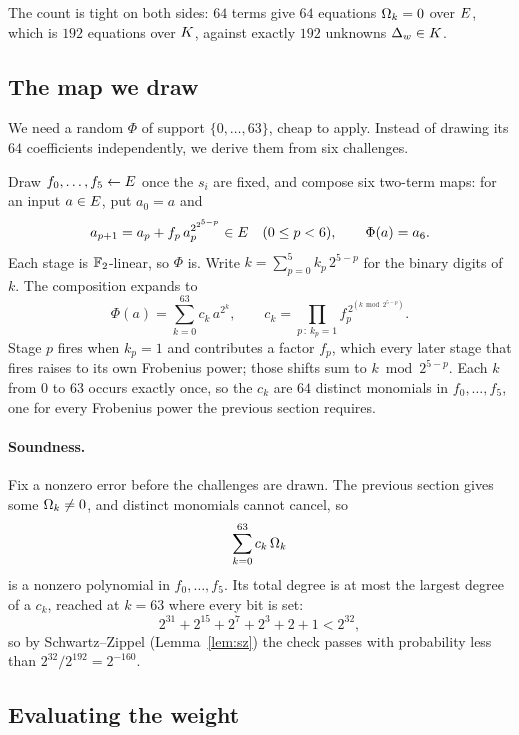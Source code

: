 The count is tight on both sides: $64$ terms give $64$ equations $\Omega_k=0$ over $E$, which is $192$ equations over $K$, against exactly $192$ unknowns $\Delta_w\in K$.

\subsection{The map we draw}\label{rs:map}

We need a random $\Phi$ of support $\{0,\dots,63\}$, cheap to apply. Instead of drawing its $64$ coefficients independently, we derive them from six challenges.

Draw $f_0,\dots,f_5\leftarrow E$ once the $s_i$ are fixed, and compose six two-term maps: for an input $a\in E$, put $a_0=a$ and
\begin{equation}
a_{p+1}=a_p+f_p\,a_p^{2^{2^{5-p}}}\in E\quad(0\le p<6),
\qquad
\Phi(a)=a_6.
\label{eq:phi}
\end{equation}
Each stage is $\mathbb{F}_2$-linear, so $\Phi$ is. Write $k=\sum_{p=0}^{5}k_p\,2^{5-p}$ for the binary digits of $k$. The composition expands to
\begin{equation}
\Phi(a)=\sum_{k=0}^{63}c_k\,a^{2^k},
\qquad
c_k=\prod_{p\,:\,k_p=1}f_p^{\,2^{(k\bmod 2^{5-p})}}.
\label{eq:ck}
\end{equation}
Stage $p$ fires when $k_p=1$ and contributes a factor $f_p$, which every later stage that fires raises to its own Frobenius power; those shifts sum to $k\bmod 2^{5-p}$. Each $k$ from $0$ to $63$ occurs exactly once, so the $c_k$ are $64$ distinct monomials in $f_0,\dots,f_5$, one for every Frobenius power the previous section requires.

\paragraph{Soundness.} Fix a nonzero error before the challenges are drawn. The previous section gives some $\Omega_k\neq0$, and distinct monomials cannot cancel, so
\[
\sum_{k=0}^{63}c_k\,\Omega_k
\]
is a nonzero polynomial in $f_0,\dots,f_5$. Its total degree is at most the largest degree of a $c_k$, reached at $k=63$ where every bit is set:
\[
2^{31}+2^{15}+2^7+2^3+2+1<2^{32},
\]
so by Schwartz--Zippel (Lemma~\ref{lem:sz}) the check passes with probability less than $2^{32}/2^{192}=2^{-160}$.

\subsection{Evaluating the weight}\label{rs:weight}

